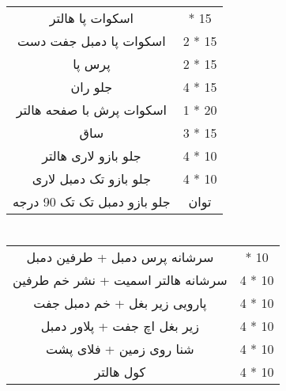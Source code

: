 \documentclass[12pt]{article}
\newcommand\myPadding{1.5}
\begin{document}
\section{}



\begin{center}
  \bgroup
  \def\arraystretch{\myPadding}%
  \begin{tabular}{ c  c  }
اسکوات پا هالتر &
 { \quad 2 * 15 \quad } \\
اسکوات پا دمبل جفت دست &
 2 * 15 \\
پرس پا &
 2 * 15 \\
جلو ران &
 4 * 15 \\
اسکوات پرش با صفحه هالتر &
 1 * 20 \\
ساق &
 3 * 15 \\
جلو بازو لاری هالتر &
 4 * 10 \\
جلو بازو تک دمبل لاری &
 4 * 10 \\
جلو بازو دمبل تک تک 90 درجه &
 توان \\
  \end{tabular}
  \egroup
\end{center}



\section{}




\begin{center}
  \bgroup
  \def\arraystretch{\myPadding}%
  \begin{tabular}{ c  c  }
سرشانه پرس دمبل + طرفین دمبل &
 { \quad 4 * 10 \quad } \\
سرشانه هالتر اسمیت + نشر خم طرفین &
 4 * 10 \\
پارویی زیر بغل + خم دمبل جفت &
 4 * 10 \\
زیر بغل اچ جفت + پلاور دمبل &
 4 * 10 \\
شنا روی زمین + فلای پشت &
 4 * 10 \\
کول هالتر &
 4 * 10 \\
  \end{tabular}
  \egroup
\end{center}







\section{}
\end{document}
